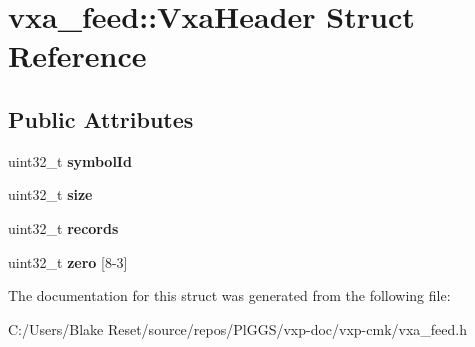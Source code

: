\hypertarget{structvxa__feed_1_1_vxa_header}{}\section{vxa\+\_\+feed\+::Vxa\+Header Struct Reference}
\label{structvxa__feed_1_1_vxa_header}
\subsection*{Public Attributes}
\begin{DoxyCompactItemize}
\item 
\mbox{\label{structvxa__feed_1_1_vxa_header_a10a239181dd0e257d9f48a18025d7091}} 
uint32\+\_\+t {\bfseries symbol\+Id}
\item 
\mbox{\label{structvxa__feed_1_1_vxa_header_a3624fc55d308ef50d814b5dbb5244469}} 
uint32\+\_\+t {\bfseries size}
\item 
\mbox{\label{structvxa__feed_1_1_vxa_header_addf8610c037999f47f5e3f8b0be75b88}} 
uint32\+\_\+t {\bfseries records}
\item 
\mbox{\label{structvxa__feed_1_1_vxa_header_ae4a6bbaad2fc8980592272929972bc7b}} 
uint32\+\_\+t {\bfseries zero} \mbox{[}8-\/3\mbox{]}
\end{DoxyCompactItemize}


The documentation for this struct was generated from the following file\+:\begin{DoxyCompactItemize}
\item 
C\+:/\+Users/\+Blake Reset/source/repos/\+Pl\+G\+G\+S/vxp-\/doc/vxp-\/cmk/vxa\+\_\+feed.\+h\end{DoxyCompactItemize}
